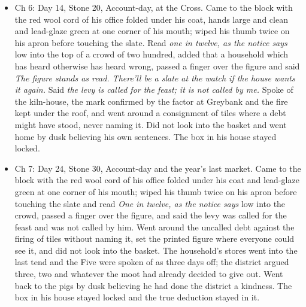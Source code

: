 \documentclass{design/chronicle}
\begin{document}
{\begin{itemize}[leftmargin=1.4em,itemsep=1pt,topsep=3pt,parsep=0pt]
\item Ch 6: Day 14, Stone 20, Account-day, at the Cross. Came to the block with the red wool cord of his office folded under his coat, hands large and clean and lead-glaze green at one corner of his mouth; wiped his thumb twice on his apron before touching the slate. Read \emph{one in twelve, as the notice says} low into the top of a crowd of two hundred, added that a household which has heard otherwise has heard wrong, passed a finger over the figure and said \emph{The figure stands as read. There’ll be a slate at the watch if the house wants it again.} Said \emph{the levy is called for the feast; it is not called by me.} Spoke of the kiln-house, the mark confirmed by the factor at Greybank and the fire kept under the roof, and went around a consignment of tiles where a debt might have stood, never naming it. Did not look into the basket and went home by dusk believing his own sentences. The box in his house stayed locked.

\end{itemize}

\begin{itemize}[leftmargin=1.4em,itemsep=1pt,topsep=3pt,parsep=0pt]

\item Ch 7: Day 24, Stone 30, Account-day and the year’s last market. Came to the block with the red wool cord of his office folded under his coat and lead-glaze green at one corner of his mouth; wiped his thumb twice on his apron before touching the slate and read \emph{One in twelve, as the notice says} low into the crowd, passed a finger over the figure, and said the levy was called for the feast and was not called by him. Went around the uncalled debt against the firing of tiles without naming it, set the printed figure where everyone could see it, and did not look into the basket. The household’s stores went into the last tend and the Five were spoken of as three days off; the district argued three, two and whatever the moot had already decided to give out. Went back to the pigs by dusk believing he had done the district a kindness. The box in his house stayed locked and the true deduction stayed in it.

\end{itemize}

\begin{itemize}[leftmargin=1.4em,itemsep=1pt,topsep=3pt,parsep=0pt]


\end{itemize}}
\end{document}
